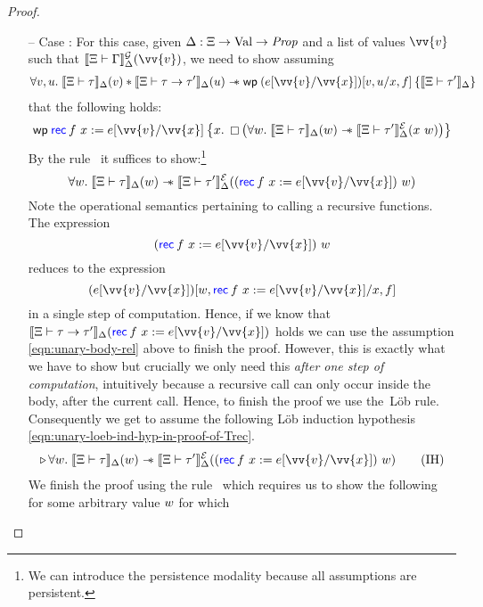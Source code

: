 \begin{proof}
\begin{itemize}
  \item[--] Case : For this case, given
    $\Delta : \Xi \to \text{Val} \to \textit{Prop}$ and a list of values
    $\vv{\val}$ such that
    $\semGtype{\Tenv}{\env}{\semenv}(\vv{\val})$, we need to show
    assuming
    \begin{align}
      \forall \val, \valC.\; \semVtype{\Tenv}{\typ}{\semenv}(\val) \ast
      \semVtype{\Tenv}{\typ \to \typ'}{\semenv}(\valC) \wand
      \wpre{\subst{(\subst{\expr}{\vv{\var}}{\vv{\val}})}{\var, f}{\val,
      \valC}}{\semVtype{\Tenv}{\typ'}{\semenv}} \label{eqn:unary-body-rel}
    \end{align}
    that the following holds:
    \[\wpre{\Rec f x = \subst{\expr}{\vv{\var}}{\vv{\val}}}{\var.\;
        \persistently\left(\forall \valB.\;
          \semVtype{\Tenv}{\typ}{\semenv}(\valB) \wand
          \semEtype{\Tenv}{\typ'}{\semenv}(\var~\valB)\right)}\]
    By the rule~ it suffices to show:\footnote{We
      can introduce the persistence modality because all assumptions
      are persistent.}
  \[\forall w.\; \semVtype{\Tenv}{\typ}{\semenv}(\valB) \wand
    \semEtype{\Tenv}{\typ'}{\semenv}((\Rec f x =
    \subst{\expr}{\vv{\var}}{\vv{\val}})~\valB)\] Note the operational
  semantics pertaining to calling a recursive functions. The
  expression
  \[(\Rec f x = \subst{\expr}{\vv{\var}}{\vv{\val}})~\valB\] reduces
  to the expression
  \[\subst{(\subst{\expr}{\vv{\var}}{\vv{\val}})}{\var, f}{\valB, \Rec
    f x = \subst{\expr}{\vv{\var}}{\vv{\val}}}\] in a single step of
computation. Hence, if we know that
$\semVtype{\Tenv}{\typ \to \typ'}{\semenv}(\Rec f x =
\subst{\expr}{\vv{\var}}{\vv{\val}})$ holds we can use the assumption
\eqref{eqn:unary-body-rel} above to finish the proof. However, this is
exactly what we have to show but crucially we only need this
\emph{after one step of computation}, intuitively because a recursive
call can only occur inside the body, after the current call. Hence, to
finish the proof we use the~{L{\"o}b}
rule. Consequently we get to assume the following L\"ob induction
hypothesis \eqref{eqn:unary-loeb-ind-hyp-in-proof-of-Trec}.
  \begin{align*}
    \later \forall w.\; \semVtype{\Tenv}{\typ}{\semenv}(\valB) \wand
    \semEtype{\Tenv}{\typ'}{\semenv}((\Rec f x =
    \subst{\expr}{\vv{\var}}{\vv{\val}})~\valB)
    \tag{IH}\label{eqn:unary-loeb-ind-hyp-in-proof-of-Trec}
  \end{align*}
  We finish the proof using the rule~ which requires
  us to show the following for some arbitrary value $w$ for which

\end{itemize}
\end{proof}
